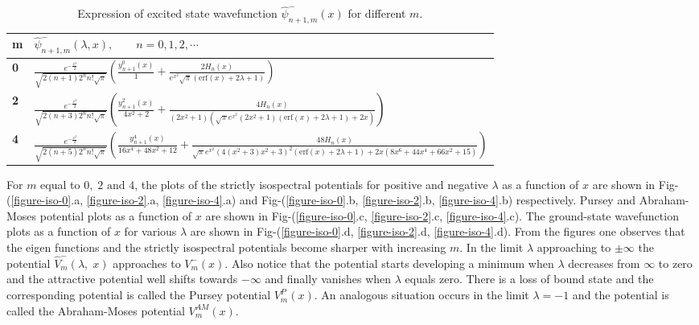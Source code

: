 \documentclass[11pt]{article}
\begin{document}
 

\begin{table}[htp]
\centering
\setlength{\tabcolsep}{1em}
\begin{tabularx}{\columnwidth}{@{}>{\bfseries}l  l @{}}
\toprule
m &  \( \hat{\psi}^-_{n+1,m}(\lambda, x) ,\qquad n=0,1,2,\cdots\)\\
\toprule
0 & \(\frac{e^{-\frac{x^2}{2}}}{\sqrt{2(n+1)2^nn!\sqrt{\pi}}} \left( \frac{y^0_{n+1}(x)}{1}+    \frac{2   H_n(x)}{e^{x^2}\sqrt{\pi } (\text{erf}(x)+2 \lambda +1)}  \right)\)\\
2 & \(\frac{e^{-\frac{x^2}{2}}}{\sqrt{2(n+3)2^nn!\sqrt{\pi}}} \left( \frac{y^2_{n+1}(x)}{4x^2+2}+   \frac{4   H_n(x)}{\left(2 x^2+1\right) \left(\sqrt{\pi } e^{x^2} \left(2 x^2+1\right) (\text{erf}(x)+2 \lambda +1)+2 x\right)}   \right) \)\\
4 & \(\frac{e^{-\frac{x^2}{2}}}{\sqrt{2(n+5)2^nn!\sqrt{\pi}}} \left( \frac{y^4_{n+1}(x)}{16x^4+48x^2+12}+   \frac{48  H_n(x)}{\sqrt{\pi } e^{x^2} \left(4 \left(x^2+3\right) x^2+3\right)^2 (\text{erf}(x)+2 \lambda +1)+2 x \left(8 x^6+44 x^4+66 x^2+15\right)}    \right) \)\\
\bottomrule
\end{tabularx}
\caption{Expression of excited state wavefunction \( \hat{\psi}^-_{n+1,m}(x) \) for different \( m \).}
\label{tab-iso-es}
\end{table}


For \( m \) equal to \( 0,\;2\text{ and } 4 \), the plots of the strictly 
isospectral potentials for positive and negative \( \lambda \) as a function of \( x \)
are shown in Fig-(\ref{figure-iso-0}.a, \ref{figure-iso-2}.a, 
\ref{figure-iso-4}.a) and Fig-(\ref{figure-iso-0}.b, \ref{figure-iso-2}.b, 
\ref{figure-iso-4}.b) respectively. Pursey and Abraham-Moses potential plots as a function of \( x \) are shown in Fig-(\ref{figure-iso-0}.c, \ref{figure-iso-2}.c, 
\ref{figure-iso-4}.c). The ground-state wavefunction plots as a function of \( x \) for various \( \lambda \) are shown in Fig-(\ref{figure-iso-0}.d, \ref{figure-iso-2}.d, 
\ref{figure-iso-4}.d).
From the figures one observes that the eigen functions and the strictly 
isospectral potentials become sharper with increasing \(m  \). 
In the limit \( \lambda \) approaching to \( \pm \infty \) the potential 
\( \hat{V}^-_m(\lambda,\;x) \) approaches to \( V^-_m(x) \). 
Also notice that the potential starts developing a minimum when \( \lambda \) 
decreases from 
\( \infty \) to zero and the attractive potential well shifts towards 
\( -\infty \) and finally vanishes when \(  \lambda\) equals zero. There is a 
loss of bound state and the corresponding potential is called the Pursey 
potential \( V^{P}_m(x) \). An analogous situation occurs in the limit 
\( \lambda=-1 \) and the potential is called the Abraham-Moses potential 
\( V^{AM}_m(x) \).
\end{document}
